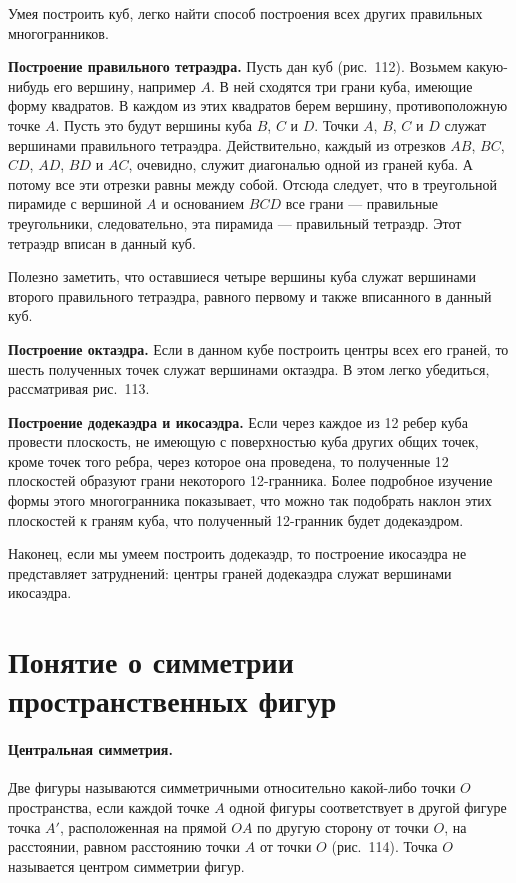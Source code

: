 \documentclass[twoside]{book}
\begin{document}
Умея построить куб, легко найти способ построения всех других правильных многогранников.

\textbf{Построение правильного тетраэдра.}
Пусть дан куб (рис.~112).
Возьмем какую-нибудь его вершину, например $A$.
В ней сходятся три грани куба, имеющие форму квадратов.
В каждом из этих квадратов берем вершину, противоположную точке $A$.
Пусть это будут вершины куба $B$, $C$ и $D$.
Точки $A$, $B$, $C$ и $D$ служат вершинами правильного тетраэдра.
Действительно, каждый из отрезков $AB$, $BC$, $CD$, $AD$, $BD$ и $AC$, очевидно, служит диагональю одной из граней куба.
А потому все эти отрезки равны между собой.
Отсюда следует, что в треугольной пирамиде с вершиной $A$ и основанием $BCD$ все грани --- правильные треугольники, следовательно, эта пирамида --- правильный тетраэдр.
Этот тетраэдр вписан в данный куб.

Полезно заметить, что оставшиеся четыре вершины куба служат вершинами второго правильного тетраэдра, равного первому и также вписанного в данный куб.

\textbf{Построение октаэдра.}
Если в данном кубе построить центры всех его граней, то шесть полученных точек служат вершинами октаэдра.
В этом легко убедиться, рассматривая рис.~113. %

\textbf{Построение додекаэдра и икосаэдра.}
Если через каждое из 12 ребер куба провести плоскость, не имеющую с поверхностью куба других общих точек, кроме точек того ребра, через которое она проведена, то полученные 12 плоскостей образуют грани некоторого 12-гранника.
Более подробное изучение формы этого многогранника показывает, что можно так подобрать наклон этих плоскостей к граням куба, что полученный 12-гранник будет додекаэдром.

Наконец, если мы умеем построить додекаэдр, то построение икосаэдра не представляет затруднений: центры граней додекаэдра служат вершинами икосаэдра.

\section{Понятие о симметрии пространственных фигур}

\paragraph{Центральная симметрия.}\label{1938/s99}
Две фигуры называются симметричными относительно какой-либо точки $O$ пространства, если каждой точке $A$ одной фигуры соответствует в другой фигуре точка $A'$, расположенная на прямой $OA$ по другую сторону от точки $O$, на расстоянии, равном расстоянию точки $A$ от точки $O$ (рис.~114).
Точка $O$ называется центром симметрии фигур.
\end{document}
